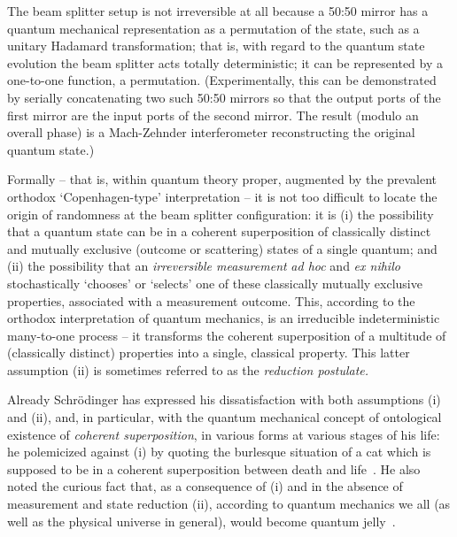 The beam splitter setup is not irreversible at all
because a 50:50 mirror has a quantum mechanical representation as a permutation of the state,
such as a unitary Hadamard transformation;
that is, with regard to the quantum state evolution the beam splitter acts totally deterministic; it can be represented
by a one-to-one function, a permutation.
(Experimentally, this can be demonstrated by serially concatenating two such 50:50 mirrors so that the output ports of the first mirror
are the input ports of the second mirror. The result (modulo an overall phase) is a Mach-Zehnder interferometer reconstructing the original
quantum state.)

Formally -- that is, within quantum theory proper, augmented by the prevalent orthodox `Copenhagen-type' interpretation --
it is not too difficult to locate the origin of randomness at the beam splitter configuration:
it is (i) the possibility that a quantum state can be in a {coherent superposition}
of classically distinct and mutually exclusive (outcome or scattering) states of a single quantum;
and (ii) the possibility that an {\em irreversible measurement} {\it ad hoc} and {\it ex nihilo} stochastically `chooses' or `selects' one of these
classically mutually exclusive properties, associated with a measurement outcome. This, according to the orthodox interpretation
of quantum mechanics, is an irreducible indeterministic many-to-one process --
it transforms the coherent superposition of a multitude of (classically distinct) properties into a single, classical property.
This latter assumption (ii) is sometimes referred to as the {\em reduction postulate.}

Already
Schr\"odinger has expressed his dissatisfaction with both assumptions (i) and (ii), and, in particular, with the quantum mechanical concept of
ontological existence of
{\em coherent superposition}, in various forms at various stages of his life:
he polemicized against (i) by quoting the burlesque situation of a cat which is supposed to be in a coherent superposition between death and life~\cite{schrodinger}.
He also noted the curious fact that, as a consequence of (i) and
in the absence of measurement and state reduction (ii), according to quantum mechanics we all (as well as the physical universe in general),
would become quantum jelly~\cite{schroedinger-interpretation}.

